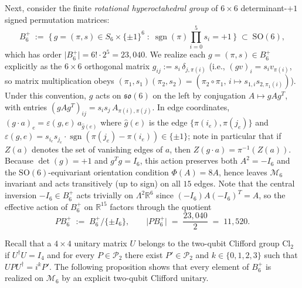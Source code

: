 \documentclass[11pt,a4paper]{article}
\theoremstyle{plain}
\theoremstyle{definition}
\theoremstyle{remark}
\newcommand{\R}{\mathbb{R}}
\newcommand{\sgn}{\operatorname{sgn}}
\newcommand{\SO}{\mathrm{SO}}
\newcommand{\Cl}{\mathrm{Cl}}
\newcommand{\Pauli}{\mathcal{P}}
\newcommand{\Mman}{\mathcal{M}_6}
\newcommand{\Bplus}{B_6^+}
\newcommand{\PBplus}{PB_6^+}
\begin{document}
Next, consider the finite \emph{rotational hyperoctahedral group} of $6\times 6$ determinant-$+1$ signed permutation matrices:
\begin{equation}
  \Bplus \;:=\; \bigl\{\, g = (\pi, s) \in S_6 \times \{\pm 1\}^6 \;:\; \sgn(\pi)\prod_{i=0}^5 s_i = +1 \,\bigr\} \;\subset\; \SO(6),
\end{equation}
which has order $\lvert \Bplus\rvert = 6! \cdot 2^5 = 23{,}040$. We realize each $g = (\pi, s) \in \Bplus$ explicitly as the $6\times 6$ orthogonal matrix $g_{ij} := s_i\,\delta_{j,\pi(i)}$ (i.e., $(gv)_i = s_i v_{\pi(i)}$, so matrix multiplication obeys $(\pi_1, s_1)(\pi_2, s_2) = (\pi_2 \circ \pi_1,\, i \mapsto s_{1,i} s_{2,\pi_1(i)})$). Under this convention, $g$ acts on $\mathfrak{so}(6)$ on the left by conjugation $A \mapsto g A g^T$, with entries $(g A g^T)_{ij} = s_i s_j\, A_{\pi(i),\pi(j)}$. In edge coordinates, $(g\cdot a)_e = \varepsilon(g, e)\, a_{\hat{g}(e)}$ where $\hat{g}(e)$ is the edge $\{\pi(i_e), \pi(j_e)\}$ and $\varepsilon(g, e) = s_{i_e} s_{j_e} \cdot \sgn(\pi(j_e) - \pi(i_e)) \in \{\pm 1\}$; note in particular that if $Z(a)$ denotes the set of vanishing edges of $a$, then $Z(g\cdot a) = \pi^{-1}(Z(a))$. Because $\det(g) = +1$ and $g^T g = I_6$, this action preserves both $A^2 = -I_6$ and the $\SO(6)$-equivariant orientation condition $\Phi(A) = 8A$, hence leaves $\Mman$ invariant and acts transitively (up to sign) on all $15$ edges. Note that the central inversion $-I_6 \in \Bplus$ acts trivially on $\Lambda^2\R^6$ since $(-I_6)A(-I_6)^T = A$, so the effective action of $\Bplus$ on $\R^{15}$ factors through the quotient
\begin{equation}
  \PBplus \;:=\; \Bplus / \{\pm I_6\}, \qquad \lvert\PBplus\rvert \;=\; \frac{23{,}040}{2} \;=\; 11{,}520.
\end{equation}

Recall that a $4\times 4$ unitary matrix $U$ belongs to the two-qubit Clifford group $\Cl_2$ if $U^\dagger U = I_4$ and for every $P \in \Pauli_2$ there exist $P' \in \Pauli_2$ and $k \in \{0,1,2,3\}$ such that $U P U^\dagger = i^k P'$. The following proposition shows that every element of $\Bplus$ is realized on $\Mman$ by an explicit two-qubit Clifford unitary.
\end{document}
